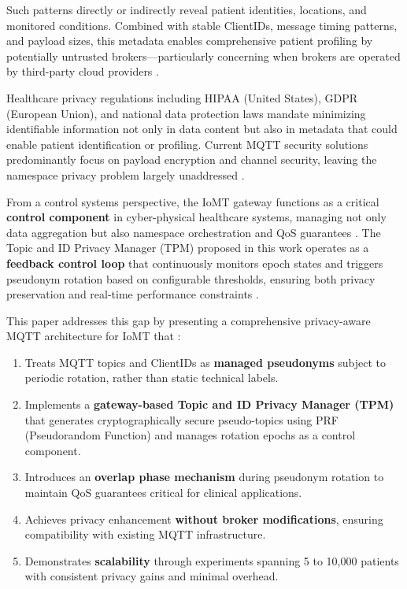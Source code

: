 \documentclass[conference]{IEEEtran}
\begin{document}
Such patterns directly or indirectly reveal patient identities, locations, and monitored conditions. Combined with stable ClientIDs, message timing patterns, and payload sizes, this metadata enables comprehensive patient profiling by potentially untrusted brokers---particularly concerning when brokers are operated by third-party cloud providers \cite{fischer_topic_privacy, mqtt_security_survey, iot_privacy_quest}.

Healthcare privacy regulations including HIPAA (United States), GDPR (European Union), and national data protection laws mandate minimizing identifiable information not only in data content but also in metadata that could enable patient identification or profiling. Current MQTT security solutions predominantly focus on payload encryption and channel security, leaving the namespace privacy problem largely unaddressed \cite{naresh_mqtt, lan_smart_healthcare, mqtt_sec_challenges, mqtt_security_framework}.

From a control systems perspective, the IoMT gateway functions as a critical \textbf{control component} in cyber-physical healthcare systems, managing not only data aggregation but also namespace orchestration and QoS guarantees \cite{cyber_physical_health}. The Topic and ID Privacy Manager (TPM) proposed in this work operates as a \textbf{feedback control loop} that continuously monitors epoch states and triggers pseudonym rotation based on configurable thresholds, ensuring both privacy preservation and real-time performance constraints \cite{iot_control_systems}.

This paper addresses this gap by presenting a comprehensive privacy-aware MQTT architecture for IoMT that \cite{mqtt_forensic_privacy, iot_security_survey}:

\begin{enumerate}
    \item Treats MQTT topics and ClientIDs as \textbf{managed pseudonyms} subject to periodic rotation, rather than static technical labels.
    \item Implements a \textbf{gateway-based Topic and ID Privacy Manager (TPM)} that generates cryptographically secure pseudo-topics using PRF (Pseudorandom Function) and manages rotation epochs as a control component.
    \item Introduces an \textbf{overlap phase mechanism} during pseudonym rotation to maintain QoS guarantees critical for clinical applications.
    \item Achieves privacy enhancement \textbf{without broker modifications}, ensuring compatibility with existing MQTT infrastructure.
    \item Demonstrates \textbf{scalability} through experiments spanning 5 to 10,000 patients with consistent privacy gains and minimal overhead.
\end{enumerate}
\end{document}

